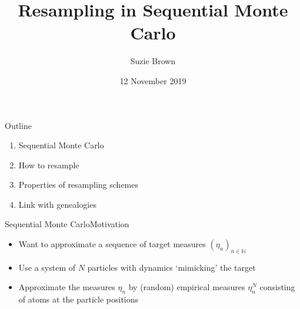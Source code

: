 \documentclass[aspectratio=169]{beamer}
\title[Resampling in SMC]{Resampling in Sequential Monte Carlo}
\author{Suzie Brown}
\date{12 November 2019}
\theoremstyle{definition}
\begin{document}
\begin{frame}
\maketitle
\end{frame}


\begin{frame}{Outline}
\begin{enumerate}
\item Sequential Monte Carlo
\item How to resample
\item Properties of resampling schemes
\item Link with genealogies
\end{enumerate}

\end{frame}


\begin{frame}{Sequential Monte Carlo}{Motivation}
\begin{itemize}
\item Want to approximate a sequence of target measures $(\eta_n)_{n\in\mathbb{N}}$
\item Use a system of $N$ particles with dynamics `mimicking' the target
\item Approximate the measures $\eta_n$ by (random) empirical measures $\eta_n^N$ consisting of atoms at the particle positions
\end{itemize}

\end{frame}
\end{document}
